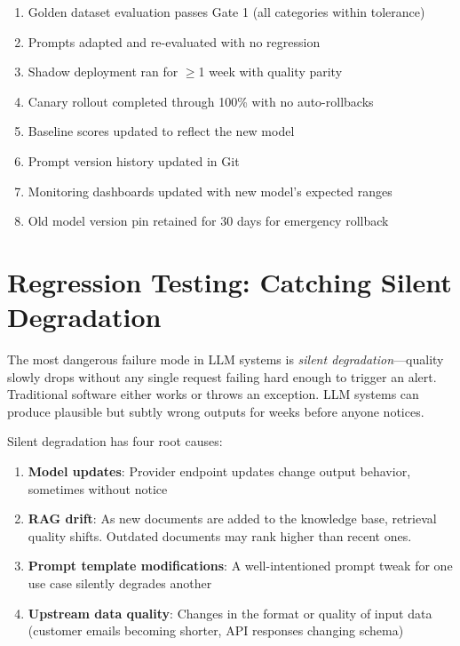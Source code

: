 \begin{enumerate}[leftmargin=*]
    \item[$\square$] Golden dataset evaluation passes Gate 1 (all categories within tolerance)
    \item[$\square$] Prompts adapted and re-evaluated with no regression
    \item[$\square$] Shadow deployment ran for $\geq$1 week with quality parity
    \item[$\square$] Canary rollout completed through 100\% with no auto-rollbacks
    \item[$\square$] Baseline scores updated to reflect the new model
    \item[$\square$] Prompt version history updated in Git
    \item[$\square$] Monitoring dashboards updated with new model's expected ranges
    \item[$\square$] Old model version pin retained for 30 days for emergency rollback
\end{enumerate}


\section{Regression Testing: Catching Silent Degradation}

The most dangerous failure mode in LLM systems is \emph{silent degradation}---quality slowly drops without any single request failing hard enough to trigger an alert. Traditional software either works or throws an exception. LLM systems can produce plausible but subtly wrong outputs for weeks before anyone notices.

Silent degradation has four root causes:

\begin{enumerate}[leftmargin=*]
    \item \textbf{Model updates}: Provider endpoint updates change output behavior, sometimes without notice
    \item \textbf{RAG drift}: As new documents are added to the knowledge base, retrieval quality shifts. Outdated documents may rank higher than recent ones.
    \item \textbf{Prompt template modifications}: A well-intentioned prompt tweak for one use case silently degrades another
    \item \textbf{Upstream data quality}: Changes in the format or quality of input data (customer emails becoming shorter, API responses changing schema)
\end{enumerate}

